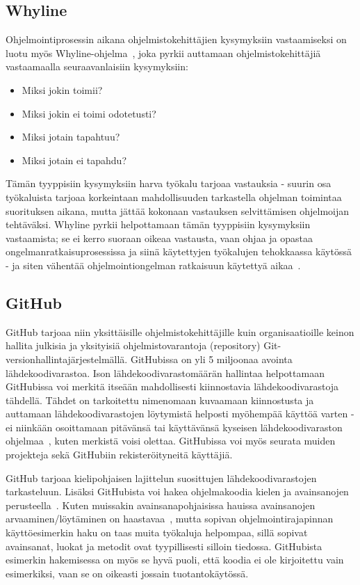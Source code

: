 \documentclass[finnish]{tktltiki2}
\theoremstyle{definition}
\theoremstyle{remark}
\begin{document}
\subsection{Whyline}
Ohjelmointiprosessin aikana ohjelmistokehittäjien kysymyksiin vastaamiseksi on luotu myös Whyline-ohjelma~\cite{whyline}, joka pyrkii auttamaan ohjelmistokehittäjiä vastaamaalla seuraavanlaisiin kysymyksiin:

\begin{itemize}
  \item Miksi jokin toimii?
  \item Miksi jokin ei toimi odotetusti?
  \item Miksi jotain tapahtuu?
  \item Miksi jotain ei tapahdu?
\end{itemize}

Tämän tyyppisiin kysymyksiin harva työkalu tarjoaa vastauksia - suurin osa työkaluista tarjoaa korkeintaan mahdollisuuden tarkastella ohjelman toimintaa suorituksen aikana, mutta jättää kokonaan vastauksen selvittämisen ohjelmoijan tehtäväksi.
Whyline pyrkii helpottamaan tämän tyyppisiin kysymyksiin vastaamista; se ei kerro suoraan oikeaa vastausta, vaan ohjaa ja opastaa ongelmanratkaisuprosessissa ja siinä käytettyjen työkalujen tehokkaassa käytössä - ja siten vähentää ohjelmointiongelman ratkaisuun käytettyä aikaa~\cite{whyline}.

\subsection{GitHub}
GitHub tarjoaa niin yksittäisille ohjelmistokehittäjille kuin organisaatioille keinon hallita julkisia ja yksityisiä ohjelmistovarantoja (repository) Git-versionhallintajärjestelmällä. GitHubissa on yli 5 miljoonaa avointa lähdekoodivarastoa.
Ison lähdekoodivarastomäärän hallintaa helpottamaan GitHubissa voi merkitä itseään mahdollisesti kiinnostavia lähdekoodivarastoja tähdellä. Tähdet on tarkoitettu nimenomaan kuvaamaan kiinnostusta ja auttamaan lähdekoodivarastojen löytymistä helposti myöhempää käyttöä varten - ei niinkään osoittamaan pitävänsä tai käyttävänsä kyseisen lähdekoodivaraston ohjelmaa~\cite{social-networking-meets-se}, kuten merkistä voisi olettaa.
GitHubissa voi myös seurata muiden projekteja sekä GitHubiin rekisteröityneitä käyttäjiä.

GitHub tarjoaa kielipohjaisen lajittelun suosittujen lähdekoodivarastojen tarkasteluun. Lisäksi GitHubista voi hakea ohjelmakoodia kielen ja avainsanojen perusteella~\cite{social-networking-meets-se}. Kuten muissakin avainsanapohjaisissa hauissa avainsanojen arvaaminen/löytäminen on haastavaa~\cite{what-to-search-for}, mutta sopivan ohjelmointirajapinnan käyttöesimerkin haku on taas muita työkaluja helpompaa, sillä sopivat avainsanat, luokat ja metodit ovat tyypillisesti silloin tiedossa. GitHubista esimerkin hakemisessa on myös se hyvä puoli, että koodia ei ole kirjoitettu vain esimerkiksi, vaan se on oikeasti jossain tuotantokäytössä.
\end{document}
